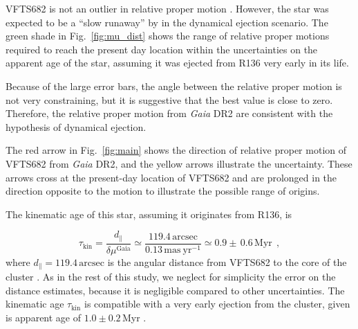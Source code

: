 \documentclass[apjl,twocolumn]{emulateapj}
\DeclareRobustCommand{\Eqref}[1]{Eq.~\ref{#1}}
\DeclareRobustCommand{\Figref}[1]{Fig.~\ref{#1}}
\begin{document}
VFTS682 is not an outlier in relative proper motion%
. However, the star was expected to be a ``slow runaway'' by \citet{bestenlehner:11} in
the dynamical ejection scenario. The green shade in
\Figref{fig:mu_dist} shows the range of relative proper motions
required to reach the present day location within
the uncertainties on the apparent age of the star, assuming it was
ejected from R136 very early in its life.

Because of the large
error bars, the angle between the relative proper motion is not very
constraining, but it is suggestive that the best value is close to zero.
Therefore, the relative proper motion from \emph{Gaia} DR2 are consistent with the hypothesis
of dynamical ejection.





The red arrow in \Figref{fig:main} shows the direction of relative proper motion of
VFTS682 from \emph{Gaia} DR2, and the
yellow arrows illustrate the uncertainty. %
These arrows cross at the present-day location of VFTS682 and
are prolonged in the direction opposite to the motion to illustrate
the possible range of origins. %


The kinematic age of this star, assuming it originates from R136, is

\begin{equation}
  \label{eq:kin_age}
  \tau_\mathrm{kin} = \frac{d_\parallel}{\delta\mu^\mathrm{Gaia}} \simeq
  \frac{119.4\,\mathrm{arcsec}}{0.13\,\mathrm{mas\ yr^{-1}}} \simeq 0.9\pm\,0.6\, \mathrm{Myr} \ \ ,
\end{equation}
where $d_\parallel = 119.4\,\mathrm{arcsec}$ is the angular distance from VFTS682 to
the core of the cluster \citep[corresponding to $\sim$29\,pc at LMC distance,][]{bestenlehner:11}.
As in the rest of this study, we neglect for
simplicity the error on the distance estimates, because it is negligible compared to other uncertainties.
The kinematic age $\tau_\mathrm{kin}$ is compatible with a very early
ejection from the cluster, given is apparent age
of $1.0\pm 0.2$\,Myr \citep{schneider:18}. %
\end{document}
